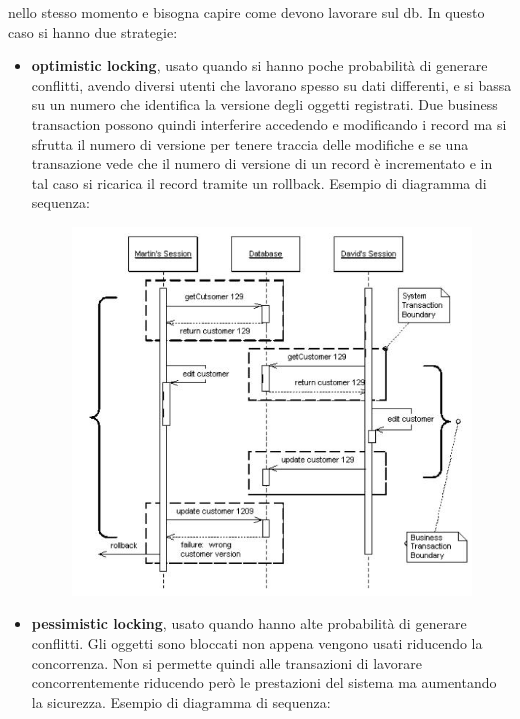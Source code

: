 \documentclass[a4paper,12pt, oneside]{book}
\begin{document}
nello stesso momento e bisogna capire come devono lavorare sul db. In questo
caso si hanno due strategie: 
\begin{itemize}
  \item \textbf{optimistic locking}, usato quando si hanno poche probabilità di
  generare conflitti, avendo diversi utenti che lavorano spesso su dati
  differenti, e si bassa su un numero che identifica la versione degli 
  oggetti registrati. Due business transaction possono quindi
  interferire accedendo e modificando i record ma si sfrutta il numero di
  versione per tenere traccia delle modifiche e se una transazione vede che il
  numero di versione di un record è incrementato e in tal caso si ricarica il
  record tramite un rollback.
  \newpage
  Esempio di diagramma di sequenza:
  \begin{figure}[H]
    \centering
    \includegraphics[scale = 0.4]{img/ol.jpg}
  \end{figure}
  \item \textbf{pessimistic locking}, usato quando hanno alte probabilità di
  generare conflitti. Gli oggetti sono bloccati non appena vengono usati
  riducendo la concorrenza. Non si permette quindi alle transazioni di lavorare
  concorrentemente riducendo però le prestazioni del sistema ma aumentando la
  sicurezza. Esempio di diagramma di sequenza: 
  \begin{figure}[H]
    \centering

\end{figure}
\end{itemize}
\end{document}
